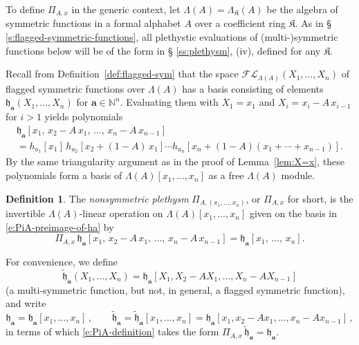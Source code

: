 \documentclass[12pt]{amsart}
\theoremstyle{definition}
\newtheorem{defn}[thm]{Definition}
\theoremstyle{remark}
\newcommand{\multisymmetric}{(multi\mbox{-})symmetric }
\newcommand{\NN}{{\mathbb N}}
\newcommand{\aA}{{\mathbf a}}
\newcommand{\fh}{{\mathfrak h}}
\newcommand{\tfh}{{\widetilde{\mathfrak h}}}
\newcommand{\Kfrak}{{\mathfrak K}}
\newcommand{\FLambda}{\mathcal{F\!L}}
\begin{document}
To define $\Pi _{A,x}$ in the generic context, let $\Lambda (A) =
\Lambda _{\Kfrak }(A)$ be the algebra of symmetric functions in a
formal alphabet $A$ over a coefficient ring $\Kfrak $.  As in \S
\ref{s:flagged-symmetric-functions}, all plethystic evaluations of
\multisymmetric functions below will be of the form in \S
\ref{ss:plethysm}, (iv), defined for any $\Kfrak $.

Recall from Definition~\ref{def:flagged-sym} that the space $\FLambda
_{\Lambda (A)}(X_{1},\ldots,X_{n})$ of flagged symmetric functions
over $\Lambda (A)$ has a basis consisting of elements $\fh _{\aA
}(X_{1},\ldots,X_{n})$ for $\aA \in \NN^n$.  Evaluating them with
$X_{1} = x_{1}$ and $X_{i} = x_{i}-A\, x_{i-1}$ for $i>1$ yields
polynomials
\begin{multline}\label{e:PiA-preimage-of-ha}
\fh _{\aA }[x_{1},\, x_{2}-A\, x_{1},\, \ldots,\, x_{n}-A\, x_{n-1}] \\
= h_{a_{1}}[x_{1}]\, h_{a_{2}}[x_{2}+(1-A)\, x_{1}]\cdots
h_{a_{n}}[x_{n}+(1-A)(x_{1}+\cdots +x_{n-1})].
\end{multline}
By the same triangularity argument as in the proof of
Lemma~\ref{lem:X=x}, these polynomials form a basis of $\Lambda
(A)[x_{1},\ldots,x_{n}]$ as a free $\Lambda (A)$ module.


\begin{defn}\label{def:PiA}
The {\em nonsymmetric plethysm } $\Pi _{A,(x_{1},\ldots,x_{n})}$, or
$\Pi _{A,x}$ for short, is the invertible $\Lambda (A)$-linear
operation on $\Lambda (A)[x_{1},\ldots,x_{n}]$ given on the basis in
\eqref{e:PiA-preimage-of-ha} by
\begin{equation}\label{e:PiA-definition}
\Pi _{A,x} \, \fh _{\aA }[x_{1},\, x_{2}-A\, x_{1},\, \ldots,\,
x_{n}-A\, x_{n-1}] = \fh _{\aA }[x_{1},\, \ldots,\, x_{n}].
\end{equation}
\end{defn}
For convenience, we define
\begin{equation}\label{e:htild}
\tfh_{\aA}(X_1,\ldots,X_n) = \fh_{\aA}[X_1,X_2-AX_1, \ldots,
X_n-AX_{n-1}]
\end{equation}
(a multi-symmetric function, but not, in general, a flagged symmetric
function), and write
\begin{equation}\label{e:flag-h-pleth}
\fh_{\aA} = \fh_{\aA}[x_1, \ldots, x_n]\,, \qquad \tfh_{\aA} =
\tfh_{\aA}[x_1, \ldots, x_n] = \fh_{\aA}[x_1,x_2-Ax_1, \ldots,
x_n-Ax_{n-1}]\,,
\end{equation}
in terms of which \eqref{e:PiA-definition} takes the form $\Pi _{A,x}
\, \tfh_{\aA } = \fh_{\aA }.$
\end{document}
